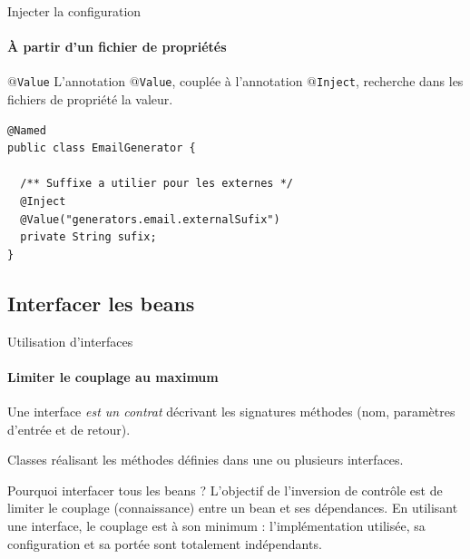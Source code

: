 \documentclass[compress]{beamer}%
\begin{document}
\begin{frame}[fragile]{Injecter la configuration}
	\framesubtitle{\`A partir d'un fichier de propriétés}

	\begin{block}{\texttt{$@$Value}}
		L'annotation \texttt{$@$Value}, couplée à l'annotation \texttt{$@$Inject}, recherche dans les fichiers de propriété la valeur.
	\end{block}

	\pause
	\begin{lstlisting}
@Named
public class EmailGenerator {

  /** Suffixe a utilier pour les externes */
  @Inject
  @Value("generators.email.externalSufix")
  private String sufix;
}
	\end{lstlisting}

\end{frame}


\subsection{Interfacer les beans}

\begin{frame}{Utilisation d'interfaces}
	\framesubtitle{Limiter le couplage au maximum}

	\begin{description}[<+->]
		\item [Interface] Une interface \emph{est un contrat} décrivant les signatures méthodes (nom, paramètres d'entrée et de retour).
		\item [Implementation] Classes réalisant les méthodes définies dans une ou plusieurs interfaces.
	\end{description}

	\pause
	\begin{block}{Pourquoi interfacer tous les beans ?}
		L'objectif de l'inversion de contrôle est de limiter le couplage (connaissance) entre un bean et ses dépendances. En utilisant une interface, le couplage est à son minimum : l'implémentation utilisée, sa configuration et sa portée sont totalement indépendants.
	\end{block}

\end{frame}
\end{document}
